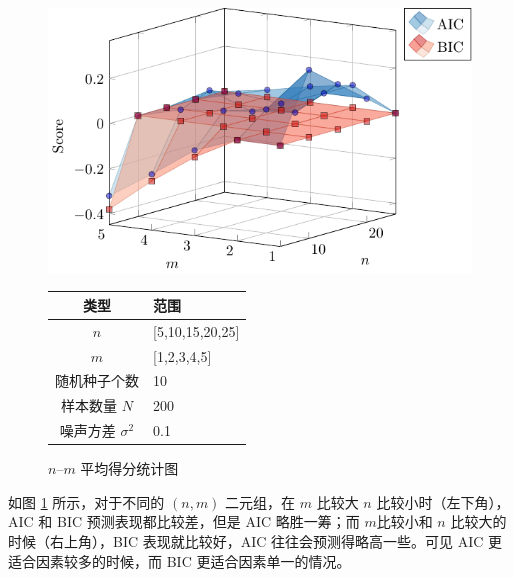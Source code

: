     \begin{figure}
        \begin{minipage}[c]{.5\linewidth}
            \centering
            \includegraphics[width=\linewidth]{fig/nm.pdf}
            \caption{$n$--$m$ 平均得分统计图}\label{fig:nm}
        \end{minipage}
        \begin{minipage}[b]{.5\linewidth}
            \centering
            \begin{tabular}{cl}
                \toprule
                类型 & 范围 \\
                \midrule
                $n$ & [5,10,15,20,25] \\
                $m$ & [1,2,3,4,5] \\
                随机种子个数 & 10 \\
                \midrule
                样本数量 $N$ & 200 \\
                噪声方差 $\sigma^2$ & 0.1 \\
                \bottomrule
            \end{tabular}
        \end{minipage}
    \end{figure}

    如图 \ref{fig:nm} 所示，对于不同的 $(n,m)$ 二元组，在 $m$ 比较大 $n$ 比较小时（左下角），AIC 和 BIC 预测表现都比较差，但是 AIC 略胜一筹；而 $m$比较小和 $n$ 比较大的时候（右上角），BIC 表现就比较好，AIC 往往会预测得略高一些。可见 AIC 更适合因素较多的时候，而 BIC 更适合因素单一的情况。

